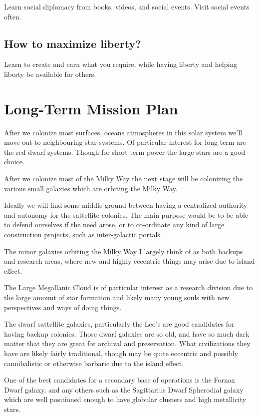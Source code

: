 \documentclass{report}
\begin{document}
Learn social diplomacy from books, videos, and social events.
Visit social events often.

\subsection{How to maximize liberty?}

Learn to create and earn what you require,
while having liberty and helping liberty be available for others.


\section{Long-Term Mission Plan}\label{intergalacticmission}

After we colonize most surfaces, oceans atmospheres in this solar system we'll
move out to neighbouring star systems.  Of particular interest for long term are
the red dwarf systems.  Though for short term power the large stars are a good
choice. 

After we colonize most of the Milky Way the next stage will be colonizing the
various small galaxies which are orbiting the Milky Way. 

Ideally we will find some middle ground between having a centralized authority
and autonomy for the sattellite colonies.  The main purpose would be to be able
to defend ourselves if the need arose, or to co-ordinate any kind of large
construction projects, such as inter-galactic portals. 

The minor galaxies orbiting the Milky Way I largely think of as both backups and
research areas, where new and highly eccentric things may arise due to island
effect. 

The Large Megallanic Cloud is of particular interest as a research
division due to the large amount of star formation and likely many young souls
with new perspectives and ways of doing things. 

The dwarf sattellite galaxies, particularly the Leo's are good candidates for 
having backup colonies. Those dwarf galaxies are so old, and have so much dark
matter that they are great for archival and preservation. What civilizations
they have are likely fairly traditional, though may be quite eccentric and
possibly cannibalistic or otherwise barbaric due to the island effect. 

One of the best candidates for a secondary base of operations is the Fornax
Dwarf galaxy, and any others such as the Sagittarius Dwarf Spherodial galaxy 
which are well positioned enough to have globular clusters and 
high metallicity stars.
\end{document}
